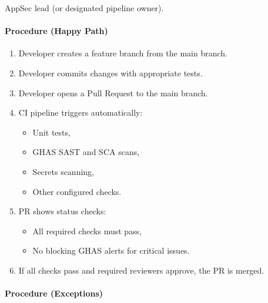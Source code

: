\documentclass[11pt]{article}
\begin{document}
AppSec lead (or designated pipeline owner).

\paragraph{Procedure (Happy Path)}

\begin{enumerate}
  \item Developer creates a feature branch from the main branch.
  \item Developer commits changes with appropriate tests.
  \item Developer opens a Pull Request to the main branch.
  \item CI pipeline triggers automatically:
        \begin{itemize}
          \item Unit tests,
          \item GHAS SAST and SCA scans,
          \item Secrets scanning,
          \item Other configured checks.
        \end{itemize}
  \item PR shows status checks:
        \begin{itemize}
          \item All required checks must pass,
          \item No blocking GHAS alerts for critical issues.
        \end{itemize}
  \item If all checks pass and required reviewers approve,
        the PR is merged.
\end{enumerate}

\paragraph{Procedure (Exceptions)}
\end{document}
